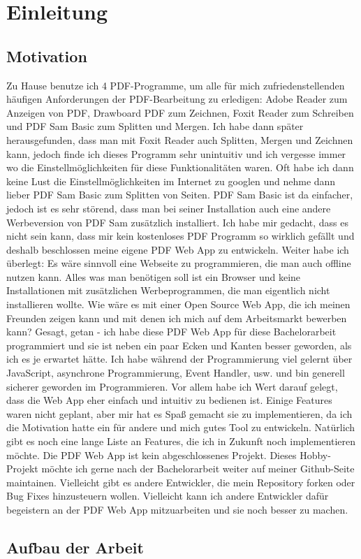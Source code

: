 \chapter*{Einleitung}


\section*{Motivation}
Zu Hause benutze ich 4 PDF-Programme, um alle für mich zufriedenstellenden häufigen Anforderungen der PDF-Bearbeitung zu erledigen: Adobe Reader zum Anzeigen von PDF, Drawboard PDF zum Zeichnen, Foxit Reader zum Schreiben und PDF Sam Basic zum Splitten und Mergen. Ich habe dann später herausgefunden, dass man mit Foxit Reader auch Splitten, Mergen und Zeichnen kann, jedoch finde ich dieses Programm sehr unintuitiv und ich vergesse immer wo die Einstellmöglichkeiten für diese Funktionalitäten waren. Oft habe ich dann keine Lust die Einstellmöglichkeiten im Internet zu googlen und nehme dann lieber PDF Sam Basic zum Splitten von Seiten. PDF Sam Basic ist da einfacher, jedoch ist es sehr störend, dass man bei seiner Installation auch eine andere Werbeversion von PDF Sam zusätzlich installiert. Ich habe mir gedacht, dass es nicht sein kann, dass mir kein kostenloses PDF Programm so wirklich gefällt und deshalb beschlossen meine eigene PDF Web App zu entwickeln. Weiter habe ich überlegt: Es wäre sinnvoll eine Webseite zu programmieren, die man auch offline nutzen kann. Alles was man benötigen soll ist ein Browser und keine Installationen mit zusätzlichen Werbeprogrammen, die man eigentlich nicht installieren wollte. Wie wäre es mit einer Open Source Web App, die ich meinen Freunden zeigen kann und mit denen ich mich auf dem Arbeitsmarkt bewerben kann? Gesagt, getan - ich habe diese PDF Web App für diese Bachelorarbeit programmiert und sie ist neben ein paar Ecken und Kanten besser geworden, als ich es je erwartet hätte. Ich habe während der Programmierung viel gelernt über JavaScript, asynchrone Programmierung, Event Handler, usw. und bin generell sicherer geworden im Programmieren. Vor allem habe ich Wert darauf gelegt, dass die Web App eher einfach und intuitiv zu bedienen ist. Einige Features waren nicht geplant, aber mir hat es Spaß gemacht sie zu implementieren, da ich die Motivation hatte ein für andere und mich gutes Tool zu entwickeln. Natürlich gibt es noch eine lange Liste an Features, die ich in Zukunft noch implementieren möchte. Die PDF Web App ist kein abgeschlossenes Projekt. Dieses Hobby-Projekt möchte ich gerne nach der Bachelorarbeit weiter auf meiner Github-Seite maintainen. Vielleicht gibt es andere Entwickler, die mein Repository forken oder Bug Fixes hinzusteuern wollen. Vielleicht kann ich andere Entwickler dafür begeistern an der PDF Web App mitzuarbeiten und sie noch besser zu machen. 

\section*{Aufbau der Arbeit}